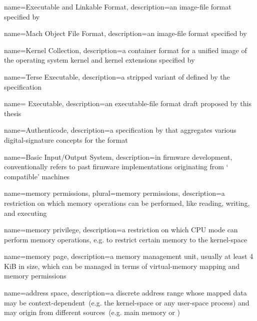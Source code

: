 {
  name={Executable and Linkable Format},
  description={an \gls{image-file} format specified by }
}

{
  name={Mach Object File Format},
  description={an \gls{image-file} format specified by }
}

{
  name={Kernel Collection},
  description={a  container format for a unified \gls{image} of the operating system kernel and kernel extensions specified by }
}

{
  name={Terse Executable},
  description={a stripped variant of  defined by the  specification}
}

{
  name={ Executable},
  description={an \gls{executable-file} format draft proposed by this thesis}
}

{
  name={Authenticode},
  description={a specification by  that aggregates various \gls{digital-signature} concepts for the  format}
}

{
  name={Basic Input/Output System},
  description={in \gls{firmware} development, conventionally refers to past \gls{firmware} implementations originating from `  compatible' machines}
}

{
  name={memory permissions},
  plural={memory permissions},
  description={a restriction on which memory operations can be performed, like reading, writing, and executing}
}

{
  name={memory privilege},
  description={a restriction on which \gls{CPU} mode can perform memory operations, e.g. to restrict certain memory to the \gls{kernel-space}}
}

{
  name={memory page},
  description={a memory management unit, usually at least 4 KiB in size, which can be managed in terms of \gls{virtual-memory} mapping and memory permissions}
}

{
  name={address space},
  description={a discrete address range whose mapped data may be context-dependent~(e.g. the \gls{kernel-space} or any \gls{user-space} process) and may origin from different sources~(e.g. main memory or )}
}

